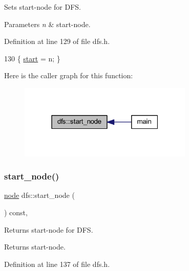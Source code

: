 Sets start-\/node for D\+FS. 


\begin{DoxyParams}{Parameters}
{\em n} & start-\/node. \\
\hline
\end{DoxyParams}


Definition at line 129 of file dfs.\+h.


\begin{DoxyCode}
130     \{ \mbox{\hyperlink{classdfs_af677cfc31fe06a18dd3a3aae7f7d112b}{start}} = n; \}
\end{DoxyCode}
Here is the caller graph for this function\+:
\nopagebreak
\begin{figure}[H]
\begin{center}
\leavevmode
\includegraphics[width=235pt]{classdfs_aad21fd0d3036350fd341f877d5747852_icgraph}
\end{center}
\end{figure}
\mbox{\label{classdfs_a7688d8eaf1308438820fec2ffe21257c}} 
\subsubsection{\texorpdfstring{start\+\_\+node()}{start\_node()}\hspace{0.1cm}{\footnotesize\ttfamily [2/2]}}
{\footnotesize\ttfamily \mbox{\hyperlink{classnode}{node}} dfs\+::start\+\_\+node (\begin{DoxyParamCaption}{ }\end{DoxyParamCaption}) const\hspace{0.3cm}{\ttfamily [inline]}, {\ttfamily [inherited]}}



Returns start-\/node for D\+FS. 

\begin{DoxyReturn}{Returns}
start-\/node. 
\end{DoxyReturn}


Definition at line 137 of file dfs.\+h.


